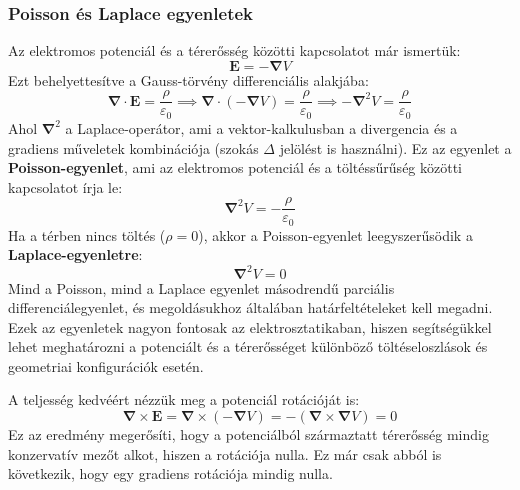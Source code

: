 \documentclass[../main.tex]{subfiles}
\begin{document}
\subsubsection{Poisson és Laplace egyenletek}
Az elektromos potenciál és a térerősség közötti kapcsolatot már ismertük:
\begin{equation}
    \mathbf{E} = - \boldsymbol{\nabla} V
\end{equation}
Ezt behelyettesítve a Gauss-törvény differenciális alakjába:
\begin{equation}
    \boldsymbol{\nabla} \cdot \mathbf{E} = \frac{\rho}{\varepsilon_0} \implies \boldsymbol{\nabla} \cdot (- \boldsymbol{\nabla} V) = \frac{\rho}{\varepsilon_0} \implies - \boldsymbol{\nabla}^2 V = \frac{\rho}{\varepsilon_0}
\end{equation}
Ahol $\boldsymbol{\nabla}^2$ a Laplace-operátor, ami a vektor-kalkulusban a divergencia és a gradiens műveletek kombinációja (szokás $\Delta$ jelölést is használni). Ez az egyenlet a \textbf{Poisson-egyenlet}, ami az elektromos potenciál és a töltéssűrűség közötti kapcsolatot írja le:
\begin{equation}
    \boxed{\boldsymbol{\nabla}^2 V = - \frac{\rho}{\varepsilon_0}}
\end{equation}
Ha a térben nincs töltés ($\rho = 0$), akkor a Poisson-egyenlet leegyszerűsödik a \textbf{Laplace-egyenletre}:
\begin{equation}
    \boxed{\boldsymbol{\nabla}^2 V = 0}
\end{equation}
Mind a Poisson, mind a Laplace egyenlet másodrendű parciális differenciálegyenlet, és megoldásukhoz általában határfeltételeket kell megadni. Ezek az egyenletek nagyon fontosak az elektrosztatikaban, hiszen segítségükkel lehet meghatározni a potenciált és a térerősséget különböző töltéseloszlások és geometriai konfigurációk esetén.

A teljesség kedvéért nézzük meg a potenciál rotációját is:
\begin{equation}
    \boldsymbol{\nabla} \times \mathbf{E} = \boldsymbol{\nabla} \times (- \boldsymbol{\nabla} V) = - (\boldsymbol{\nabla} \times \boldsymbol{\nabla} V) = 0
\end{equation}
Ez az eredmény megerősíti, hogy a potenciálból származtatt térerősség mindig konzervatív mezőt alkot, hiszen a rotációja nulla. Ez már csak abból is következik, hogy egy gradiens rotációja mindig nulla.
\end{document}
